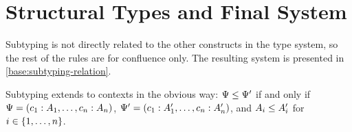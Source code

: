
\section{Structural Types and Final System}

Subtyping is not directly related to the other constructs in the type system, so the rest of the rules are for confluence only. The resulting system is presented in \cref{base:subtyping-relation}.


Subtyping extends to contexts in the obvious way: $\Psi \le \Psi'$ if and only if $\Psi = (c_1 : A_1, \ldots, c_n : A_n)$, $\Psi' = (c_1 : A_1', \ldots, c_n : A_n')$, and $A_i \le A_i'$ for $i \in \lbrace1, \ldots, n\rbrace$.


